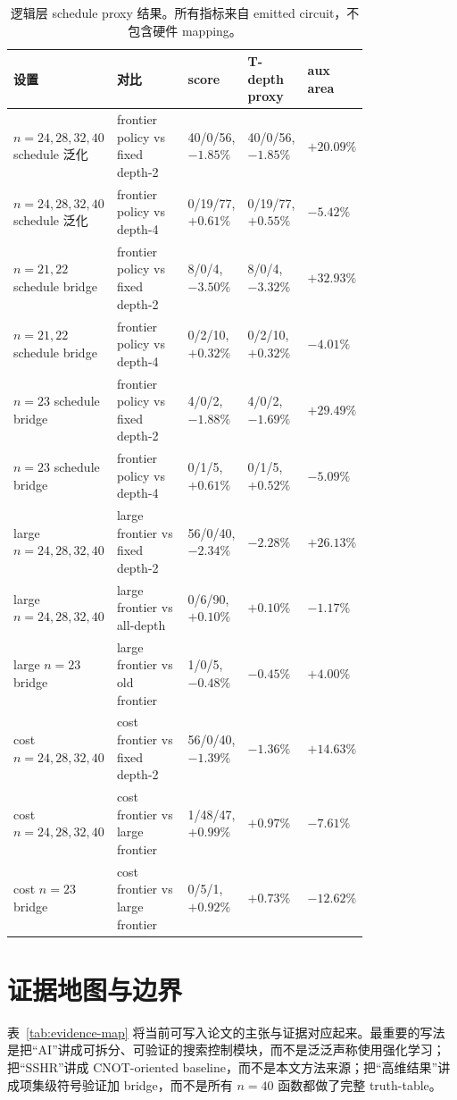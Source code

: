 \documentclass[UTF8,fontset=macnew,11pt]{ctexart}
\newcommand{\ttable}{truth-table}
\begin{document}
\begin{table}[H]
\centering
\tiny
\caption{逻辑层 schedule proxy 结果。所有指标来自 emitted circuit，不包含硬件 mapping。}
\label{tab:schedule}
\begin{tabular}{@{}p{0.20\linewidth}p{0.20\linewidth}p{0.14\linewidth}p{0.15\linewidth}p{0.10\linewidth}@{}}
\toprule
设置 & 对比 & score & T-depth proxy & aux area \\
\midrule
$n=24,28,32,40$ schedule 泛化 & frontier policy vs fixed depth-2 & 40/0/56, $-1.85\%$ & 40/0/56, $-1.85\%$ & $+20.09\%$ \\
$n=24,28,32,40$ schedule 泛化 & frontier policy vs depth-4 & 0/19/77, $+0.61\%$ & 0/19/77, $+0.55\%$ & $-5.42\%$ \\
$n=21,22$ schedule bridge & frontier policy vs fixed depth-2 & 8/0/4, $-3.50\%$ & 8/0/4, $-3.32\%$ & $+32.93\%$ \\
$n=21,22$ schedule bridge & frontier policy vs depth-4 & 0/2/10, $+0.32\%$ & 0/2/10, $+0.32\%$ & $-4.01\%$ \\
$n=23$ schedule bridge & frontier policy vs fixed depth-2 & 4/0/2, $-1.88\%$ & 4/0/2, $-1.69\%$ & $+29.49\%$ \\
$n=23$ schedule bridge & frontier policy vs depth-4 & 0/1/5, $+0.61\%$ & 0/1/5, $+0.52\%$ & $-5.09\%$ \\
large $n=24,28,32,40$ & large frontier vs fixed depth-2 & 56/0/40, $-2.34\%$ & $-2.28\%$ & $+26.13\%$ \\
large $n=24,28,32,40$ & large frontier vs all-depth & 0/6/90, $+0.10\%$ & $+0.10\%$ & $-1.17\%$ \\
large $n=23$ bridge & large frontier vs old frontier & 1/0/5, $-0.48\%$ & $-0.45\%$ & $+4.00\%$ \\
cost $n=24,28,32,40$ & cost frontier vs fixed depth-2 & 56/0/40, $-1.39\%$ & $-1.36\%$ & $+14.63\%$ \\
cost $n=24,28,32,40$ & cost frontier vs large frontier & 1/48/47, $+0.99\%$ & $+0.97\%$ & $-7.61\%$ \\
cost $n=23$ bridge & cost frontier vs large frontier & 0/5/1, $+0.92\%$ & $+0.73\%$ & $-12.62\%$ \\
\bottomrule
\end{tabular}
\end{table}

\section{证据地图与边界}

表~\ref{tab:evidence-map} 将当前可写入论文的主张与证据对应起来。最重要的写法是把“AI”讲成可拆分、可验证的搜索控制模块，而不是泛泛声称使用强化学习；把“SSHR”讲成 CNOT-oriented baseline，而不是本文方法来源；把“高维结果”讲成项集级符号验证加 bridge，而不是所有 $n=40$ 函数都做了完整 \ttable{}。
\end{document}
